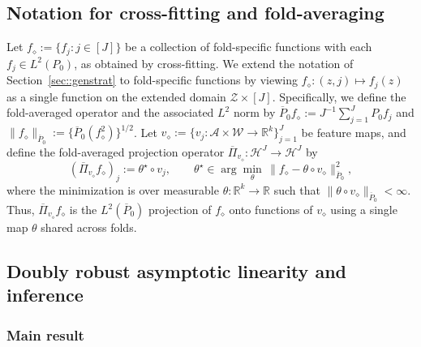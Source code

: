 \documentclass[11pt]{article}
\theoremstyle{plain}
\begin{document}
\subsection{Notation for cross-fitting and fold-averaging}
\label{section::theory::crossfit}

Let $f_{\diamond} := \{f_j : j \in [J]\}$ be a collection of fold-specific functions with each $f_j \in L^2(P_0)$, as obtained by cross-fitting. We extend the notation of Section~\ref{sec::genstrat} to fold-specific functions by viewing $f_{\diamond}:(z,j)\mapsto f_j(z)$ as a single function on the extended domain $\mathcal{Z}\times[J]$. Specifically, we define the fold-averaged operator and the associated $L^2$ norm by
$\overline{P}_0 f_{\diamond} := J^{-1}\sum_{j=1}^J P_0 f_j$ and
$\|f_{\diamond}\|_{\overline{P}_0} := \{\overline{P}_0(f_{\diamond}^2)\}^{1/2}$.
Let
$v_{\diamond} := \{v_j:\mathcal{A}\times\mathcal{W}\to\mathbb{R}^k\}_{j=1}^J$ be
feature maps, and define the fold-averaged projection operator
$\overline{\Pi}_{v_{\diamond}}:\mathcal{H}^J\to\mathcal{H}^J$ by
\[
(\overline{\Pi}_{v_{\diamond}} f_{\diamond})_j := \theta^\star \circ v_j,
\qquad
\theta^\star \in \arg\min_{\theta}\, \|f_{\diamond} - \theta \circ v_{\diamond}\|_{\overline{P}_0}^2,
\]
where the minimization is over measurable $\theta:\mathbb{R}^k\to\mathbb{R}$ such
that $\|\theta\circ v_{\diamond}\|_{\overline{P}_0}<\infty$. Thus,
$\overline{\Pi}_{v_{\diamond}} f_{\diamond}$ is the $L^2(\overline{P}_0)$
projection of $f_{\diamond}$ onto functions of $v_{\diamond}$ using a single map
$\theta$ shared across folds. 



\subsection{Doubly robust asymptotic linearity and inference}
\label{Section::DR}

\subsubsection{Main result}
\end{document}
